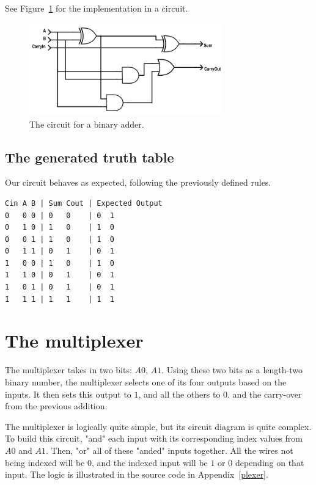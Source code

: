 \documentclass[]{article}
\begin{document}
See Figure~\ref{adder} for the implementation in a circuit.
	
\begin{figure}[H]
	\label{adder}
	\centering
	\includegraphics[width=0.75\textwidth]{adder.png}
				
	\caption{The circuit for a binary adder.}
\end{figure}

\subsection{The generated truth table}

Our circuit behaves as expected, following the previously defined rules.

\begin{lstlisting}
Cin A B | Sum Cout | Expected Output
0   0 0 | 0   0    | 0  1
0   1 0 | 1   0    | 1  0
0   0 1 | 1   0    | 1  0
0   1 1 | 0   1    | 0  1
1   0 0 | 1   0    | 1  0
1   1 0 | 0   1    | 0  1
1   0 1 | 0   1    | 0  1
1   1 1 | 1   1    | 1  1
\end{lstlisting}

\section{The multiplexer}

The multiplexer takes in two bits: $A0$, $A1$. Using these two bits as a length-two binary number, the multiplexer selects one of its four outputs based on the inputs. It then sets this output to $1$, and all the others to $0$. and the carry-over from the previous addition.

The multiplexer is logically quite simple, but its circuit diagram is quite complex. To build this circuit, "and" each input with its corresponding index values from $A0$ and $A1$. Then, "or" all of these "anded" inputs together. All the wires not being indexed will be $0$, and the indexed input will be $1$ or $0$ depending on that input. The logic is illustrated in the source code in Appendix~\ref{plexer}.
\end{document}
